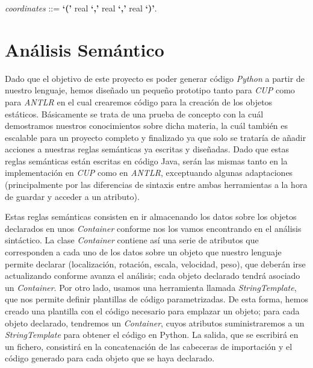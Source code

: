 \documentclass[12pt]{article}
\begin{document}
\noindent \textit{coordinates} ::= \textbf{`('} real \textbf{`,'} real \textbf{`,'} real \textbf{`)'}.

\section{Análisis Semántico}

Dado que el objetivo de este proyecto es poder generar código \textit{Python} a partir de nuestro lenguaje, hemos diseñado un pequeño prototipo tanto para \textit{CUP} como para \textit{ANTLR} en el cual crearemos código para la creación de los objetos estáticos. Básicamente se trata de una prueba de concepto con la cuál demostramos nuestros conocimientos sobre dicha materia, la cuál también es escalable para un proyecto completo y finalizado ya que solo se trataría de añadir acciones a nuestras reglas semánticas ya escritas y diseñadas. Dado que estas reglas semánticas están escritas en código Java, serán las mismas tanto en la implementación en \textit{CUP} como en \textit{ANTLR}, exceptuando algunas adaptaciones (principalmente por las diferencias de sintaxis entre ambas herramientas a la hora de guardar y acceder a un atributo).

Estas reglas semánticas consisten en ir almacenando los datos sobre los objetos declarados en unos \textit{Container} conforme nos los vamos encontrando en el análisis sintáctico. La clase \textit{Container} contiene así una serie de atributos que corresponden a cada uno de los datos sobre un objeto que nuestro lenguaje permite declarar (localización, rotación, escala, velocidad, peso), que deberán irse actualizando conforme avanza el análisis; cada objeto declarado tendrá asociado un \textit{Container}. Por otro lado, usamos una herramienta llamada \textit{StringTemplate}, que nos permite definir plantillas de código parametrizadas. De esta forma, hemos creado una plantilla con el código necesario para emplazar un objeto; para cada objeto declarado, tendremos un \textit{Container}, cuyos atributos suministraremos a un \textit{StringTemplate} para obtener el código en Python. La salida, que se escribirá en un fichero, consistirá en la concatenación de las cabeceras de importación y el código generado para cada objeto que se haya declarado.

\newpage


\end{document}
